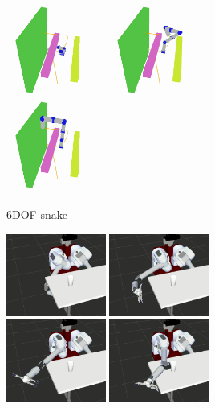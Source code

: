 \documentclass[letterpaper, 10 pt, conference]{ieeeconf}  %
\begin{document}
\begin{figure}[t!]
\begin{subfigure}[b]{\textwidth}
		\includegraphics[height=3cm]{fig/planning_efficiency/6dof_3}
		\includegraphics[height=3cm]{fig/planning_efficiency/6dof_4}
		\includegraphics[height=3cm]{fig/planning_efficiency/6dof_5}
		\caption{6DOF snake}
		\label{fig:planning_efficiency:6dof:example}
	\end{subfigure}
	\begin{subfigure}[b]{\textwidth}
    \centering
    \includegraphics[height=2.7cm]{fig/planning_efficiency/herb_batting_1}
    \includegraphics[height=2.7cm]{fig/planning_efficiency/herb_batting_2}
    \includegraphics[height=2.7cm]{fig/planning_efficiency/herb_batting_3}
    \includegraphics[height=2.7cm]{fig/planning_efficiency/herb_batting_4}

\end{subfigure}
\end{figure}
\end{document}
